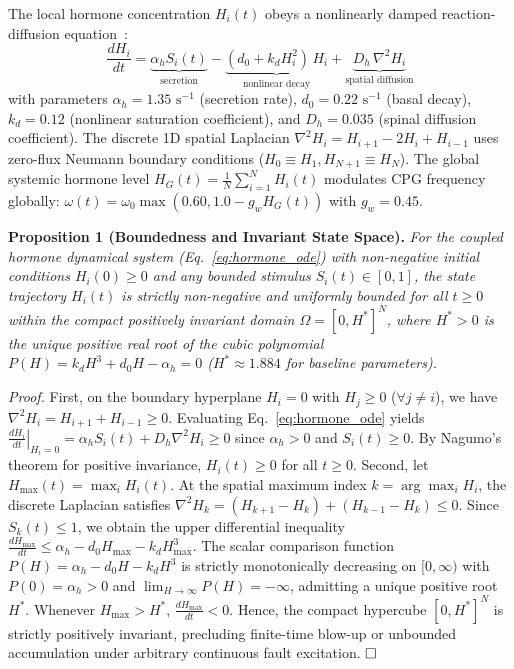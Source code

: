 \documentclass{iopjournal}
\begin{document}
The local hormone concentration $H_i(t)$ obeys a nonlinearly damped reaction-diffusion equation~\cite{turing1952,meinhardt1982,arena2000}:
\begin{equation}
\frac{d H_i}{dt} = \underbrace{\alpha_h S_i(t)}_{\text{secretion}} - \underbrace{(d_0 + k_d H_i^2)\, H_i}_{\text{nonlinear decay}} + \underbrace{D_h\, \nabla^2 H_i}_{\text{spatial diffusion}}
\label{eq:hormone_ode}
\end{equation}
with parameters $\alpha_h = 1.35\text{ s}^{-1}$ (secretion rate), $d_0 = 0.22\text{ s}^{-1}$ (basal decay), $k_d = 0.12$ (nonlinear saturation coefficient), and $D_h = 0.035$ (spinal diffusion coefficient). The discrete 1D spatial Laplacian $\nabla^2 H_i = H_{i+1} - 2H_i + H_{i-1}$ uses zero-flux Neumann boundary conditions ($H_0 \equiv H_1, H_{N+1} \equiv H_N$). The global systemic hormone level $H_G(t) = \frac{1}{N}\sum_{i=1}^N H_i(t)$ modulates CPG frequency globally: $\omega(t) = \omega_0 \max(0.60, 1.0 - g_w H_G(t))$ with $g_w = 0.45$.

\vspace{0.5em}
\noindent\textbf{Proposition 1 (Boundedness and Invariant State Space).} \textit{For the coupled hormone dynamical system (Eq.~\ref{eq:hormone_ode}) with non-negative initial conditions $H_i(0) \ge 0$ and any bounded stimulus $S_i(t) \in [0, 1]$, the state trajectory $H_i(t)$ is strictly non-negative and uniformly bounded for all $t \ge 0$ within the compact positively invariant domain $\Omega = [0, H^*]^N$, where $H^* > 0$ is the unique positive real root of the cubic polynomial $P(H) = k_d H^3 + d_0 H - \alpha_h = 0$ ($H^* \approx 1.884$ for baseline parameters).}

\vspace{0.3em}
\noindent\textit{Proof.} First, on the boundary hyperplane $H_i = 0$ with $H_j \ge 0$ ($\forall j \neq i$), we have $\nabla^2 H_i = H_{i+1} + H_{i-1} \ge 0$. Evaluating Eq.~\ref{eq:hormone_ode} yields $\left.\frac{dH_i}{dt}\right|_{H_i = 0} = \alpha_h S_i(t) + D_h \nabla^2 H_i \ge 0$ since $\alpha_h > 0$ and $S_i(t) \ge 0$. By Nagumo's theorem for positive invariance, $H_i(t) \ge 0$ for all $t \ge 0$. Second, let $H_{\max}(t) = \max_{i} H_i(t)$. At the spatial maximum index $k = \arg\max_i H_i$, the discrete Laplacian satisfies $\nabla^2 H_k = (H_{k+1} - H_k) + (H_{k-1} - H_k) \le 0$. Since $S_k(t) \le 1$, we obtain the upper differential inequality $\frac{d H_{\max}}{dt} \le \alpha_h - d_0 H_{\max} - k_d H_{\max}^3$. The scalar comparison function $P(H) = \alpha_h - d_0 H - k_d H^3$ is strictly monotonically decreasing on $[0, \infty)$ with $P(0) = \alpha_h > 0$ and $\lim_{H \to \infty} P(H) = -\infty$, admitting a unique positive root $H^*$. Whenever $H_{\max} > H^*$, $\frac{d H_{\max}}{dt} < 0$. Hence, the compact hypercube $[0, H^*]^N$ is strictly positively invariant, precluding finite-time blow-up or unbounded accumulation under arbitrary continuous fault excitation. $\hfill\square$
\end{document}

